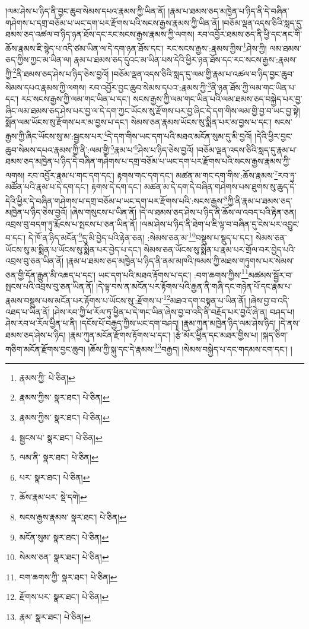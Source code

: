 །ལམ་ཤེས་པ་ཉིད་ནི་བྱང་ཆུབ་སེམས་དཔའ་རྣམས་ཀྱི་ཡིན་ནོ། །རྣམ་པ་ཐམས་ཅད་མཁྱེན་པ་ཉིད་ནི་དེ་བཞིན་གཤེགས་པ་དགྲ་བཅོམ་པ་ཡང་དག་པར་རྫོགས་པའི་སངས་རྒྱས་རྣམས་ཀྱི་ཡིན་ནོ། །བཅོམ་ལྡན་འདས་ཅིའི་སླད་དུ་ཐམས་ཅད་འཚལ་བ་ཉིད་ཉན་ཐོས་དང་རང་སངས་རྒྱས་རྣམས་ཀྱི་ལགས། རབ་འབྱོར་ཐམས་ཅད་ནི་ཕྱི་དང་ནང་གི་ཆོས་རྣམས་ཇི་སྙེད་པ་འདི་ཙམ་ཡིན་ལ་དེ་དག་ཉན་ཐོས་དང་། རང་སངས་རྒྱས་:རྣམས་ཀྱིས་\footnote{རྣམས་ཀྱི་  པེ་ཅིན། }ཤེས་ཀྱི། ལམ་ཐམས་ཅད་ཀྱིས་ཀྱང་མ་ཡིན་ལ། རྣམ་པ་ཐམས་ཅད་དུའང་མ་ཡིན་པས་དེའི་ཕྱིར་ཉན་ཐོས་དང་རང་སངས་རྒྱས་:རྣམས་ཀྱི་\footnote{རྣམས་ཀྱིས་  སྣར་ཐང་།  པེ་ཅིན། }ནི་ཐམས་ཅད་ཤེས་པ་ཉིད་ཅེས་བྱའོ། །བཅོམ་ལྡན་འདས་ཅིའི་སླད་དུ་ལམ་གྱི་རྣམ་པ་འཚལ་བ་ཉིད་བྱང་ཆུབ་སེམས་དཔའ་རྣམས་ཀྱི་ལགས། རབ་འབྱོར་བྱང་ཆུབ་སེམས་དཔའ་:རྣམས་ཀྱི་\footnote{རྣམས་ཀྱིས་  སྣར་ཐང་།  པེ་ཅིན། }ནི་ཉན་ཐོས་ཀྱི་ལམ་གང་ཡིན་པ་དང་། རང་སངས་རྒྱས་ཀྱི་ལམ་གང་ཡིན་པ་དང་། སངས་རྒྱས་ཀྱི་ལམ་གང་ཡིན་པའི་ལམ་ཐམས་ཅད་བསྐྱེད་པར་བྱ་ཞིང་ལམ་ཐམས་ཅད་ཤེས་པར་བྱ་ལ་དེ་དག་ཀྱང་ཡོངས་སུ་རྫོགས་པར་བྱ་ཞིང་དེ་དག་གིས་ལམ་གྱི་བྱ་བ་ཡང་བྱ་སྟེ། སྨོན་ལམ་ཡོངས་སུ་རྫོགས་པར་མ་བྱས་པ་དང་། སེམས་ཅན་རྣམས་ཡོངས་སུ་སྨིན་པར་མ་བྱས་པ་དང་། སངས་རྒྱས་ཀྱི་ཞིང་ཡོངས་སུ་མ་:སྦྱངས་པར་\footnote{སྦྱངས་པ་  སྣར་ཐང་།  པེ་ཅིན། }དེ་དག་གིས་ཡང་དག་པའི་མཐའ་མངོན་སུམ་དུ་མི་བྱའོ། །དེའི་ཕྱིར་བྱང་ཆུབ་སེམས་དཔའ་རྣམས་ཀྱི་ནི་:ལམ་གྱི་\footnote{ལམ་ནི་  སྣར་ཐང་།  པེ་ཅིན། }རྣམ་པ་\footnote{པར་  སྣར་ཐང་།  པེ་ཅིན། }ཤེས་པ་ཉིད་ཅེས་བྱའོ། །བཅོམ་ལྡན་འདས་ཅིའི་སླད་དུ་རྣམ་པ་ཐམས་ཅད་མཁྱེན་པ་ཉིད་དེ་བཞིན་གཤེགས་པ་དགྲ་བཅོམ་པ་ཡང་དག་པར་རྫོགས་པའི་སངས་རྒྱས་རྣམས་ཀྱི་ལགས། རབ་འབྱོར་རྣམ་པ་གང་དག་དང་། རྟགས་གང་དག་དང་། མཚན་མ་གང་དག་གིས་:ཆོས་རྣམས་\footnote{ཆོས་རྣམ་པར་  སྡེ་དགེ། }རབ་ཏུ་མཚོན་པའི་རྣམ་པ་དེ་དག་དང་། རྟགས་དེ་དག་དང་། མཚན་མ་དེ་དག་དེ་བཞིན་གཤེགས་པས་ཐུགས་སུ་ཆུད་དེ་དེའི་ཕྱིར་དེ་བཞིན་གཤེགས་པ་དགྲ་བཅོམ་པ་ཡང་དག་པར་རྫོགས་པའི་:སངས་རྒྱས་\footnote{སངས་རྒྱས་རྣམས་  སྣར་ཐང་།  པེ་ཅིན། }ཀྱི་ནི་རྣམ་པ་ཐམས་ཅད་མཁྱེན་པ་ཉིད་ཅེས་བྱའོ། །ཞེས་གསུངས་པ་ཡིན་ནོ། །དེ་ལ་ཐམས་ཅད་ཤེས་པ་ཉིད་ནི་ཆོས་ལ་འབད་པའི་རྟེན་ཅན། འབྲས་བུ་བདག་ཏུ་རྨོངས་པ་སྤངས་པ་ཅན་ཡིན་ནོ། །ལམ་ཤེས་པ་ཉིད་ནི་ཐེག་པ་ཇི་ལྟ་བ་བཞིན་དུ་ངེས་པར་འབྱུང་བ་དང་། དེ་ཁོ་ན་ཉིད་མངོན་\footnote{མངོན་སུམ་  སྣར་ཐང་།  པེ་ཅིན། }དུ་མི་བྱེད་པའི་རྟེན་ཅན། :སེམས་ཅན་མ་\footnote{སེམས་ཅན་  སྣར་ཐང་།  པེ་ཅིན། }བསྡུས་པ་སྡུད་པ་དང་། སེམས་ཅན་ཡོངས་སུ་མ་སྨིན་པ་ཡོངས་སུ་སྨིན་པར་བྱེད་པ་དང་། སེམས་ཅན་ཡོངས་སུ་སྨིན་པ་རྣམ་པར་གྲོལ་བར་བྱེད་པའི་འབྲས་བུ་ཅན་ཡིན་ནོ། །རྣམ་པ་ཐམས་ཅད་མཁྱེན་པ་ཉིད་ནི་ནམ་མཁའི་ཁམས་ཀྱི་མཐས་གཏུགས་པར་སེམས་ཅན་གྱི་དོན་རྒྱུན་མི་འཆད་པ་དང་། ཡང་དག་པའི་མཐའ་རྟོགས་པ་དང་། :བག་ཆགས་ཀྱིས་\footnote{བག་ཆགས་ཀྱི་  སྣར་ཐང་།  པེ་ཅིན། }མཚམས་སྦྱོར་བ་སྤངས་པའི་འབྲས་བུ་ཅན་ཡིན་ནོ། །དེ་ལྟ་བས་ན་མངོན་པར་རྟོགས་པའི་རྒྱན་ནི་གཞི་དང་གཉེན་པོ་དང་རྣམ་པ་རྣམས་བསྡུས་པས་མངོན་པར་རྟོགས་པ་ཡོངས་སུ་:རྫོགས་པ་\footnote{རྫོགས་པར་  སྣར་ཐང་།  པེ་ཅིན། }མཐའ་དག་བསྟན་པ་ཡིན་ནོ། །ཞེས་བྱ་བ་འདི་འཐད་པ་ཡིན་ནོ། །ཤེས་རབ་ཀྱི་ཕ་རོལ་ཏུ་ཕྱིན་པ་དེ་གང་ཡིན་ཞེས་བྱ་བ་འདི་ནི་བརྗོད་པར་བྱའོ་ཞེ་ན། བཤད་པ། ཤེས་རབ་ཕ་རོལ་ཕྱིན་པ་ནི། །དངོས་པོ་བརྒྱད་ཀྱིས་ཡང་དག་བཤད། །རྣམ་ཀུན་མཁྱེན་ཉིད་ལམ་ཤེས་ཉིད། །དེ་ནས་ཐམས་ཅད་ཤེས་པ་ཉིད། །རྣམ་ཀུན་མངོན་རྫོགས་རྟོགས་པ་དང་། །རྩེ་མོར་ཕྱིན་དང་མཐར་གྱིས་པ། །སྐད་ཅིག་གཅིག་མངོན་རྫོགས་བྱང་ཆུབ། །ཆོས་ཀྱི་སྐུ་དང་དེ་རྣམས་\footnote{རྣམ་  སྣར་ཐང་།  པེ་ཅིན། }བརྒྱད། །སེམས་བསྐྱེད་པ་དང་གདམས་ངག་དང་། །
